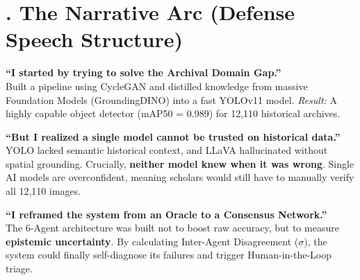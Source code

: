 \documentclass[11pt, a4paper]{article}
\begin{document}
\begin{figure}[h!]
\end{figure}

\vspace{1cm}

\section*{. The Narrative Arc (Defense Speech Structure)}

\begin{tcolorbox}[enhanced, colback=Phase1!5, colframe=Phase1!80!black, title=\textbf{Chapter 1: The Initial Idea (Knowledge Distillation)}]
\textbf{``I started by trying to solve the Archival Domain Gap.''} \\
Built a pipeline using CycleGAN and distilled knowledge from massive Foundation Models (GroundingDINO) into a fast YOLOv11 model. \textit{Result:} A highly capable object detector (mAP50 = 0.989) for 12,110 historical archives.
\end{tcolorbox}

\begin{tcolorbox}[enhanced, colback=Phase3!5, colframe=Phase3!80!black, title=\textbf{Chapter 2: The Problem Discovered (Hallucinations \& Overconfidence)}]
\textbf{``But I realized a single model cannot be trusted on historical data.''} \\
YOLO lacked semantic historical context, and LLaVA hallucinated without spatial grounding. Crucially, \textbf{neither model knew when it was wrong}. Single AI models are overconfident, meaning scholars would still have to manually verify all 12,110 images.
\end{tcolorbox}

\begin{tcolorbox}[enhanced, colback=Phase2!5, colframe=Phase2!80!black, title=\textbf{Chapter 3: The Multi-Agent Solution (Uncertainty via Disagreement)}]
\textbf{``I reframed the system from an Oracle to a Consensus Network.''} \\
The 6-Agent architecture was built not to boost raw accuracy, but to measure \textbf{epistemic uncertainty}. By calculating Inter-Agent Disagreement ($\sigma$), the system could finally self-diagnose its failures and trigger Human-in-the-Loop triage.
\end{tcolorbox}
\end{document}
